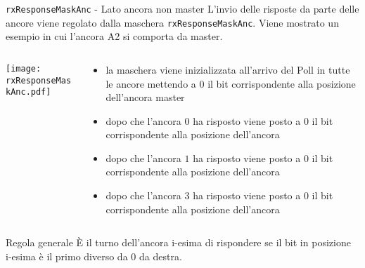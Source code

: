 \begin{frame}[shrink=10]{\lstinline[language=C]!rxResponseMaskAnc! - Lato ancora \alert{non} master}
  L'invio delle risposte da parte delle ancore viene regolato dalla maschera \lstinline[language=C]!rxResponseMaskAnc!.
  Viene mostrato un esempio in cui l'ancora A2 si comporta da master.
  \begin{columns}
    \begin{column}{0.4\textwidth}
      \begin{center}
        \texttt{[image: rxResponseMaskAnc.pdf]}
      \end{center}
    \end{column}
    \begin{column}{0.7\textwidth}
      \begin{itemize}
      \item[1)] la maschera viene inizializzata all'arrivo del Poll in tutte le ancore mettendo a $0$ il bit corrispondente alla posizione dell'ancora master
      \item[2)] dopo che l'ancora $0$ ha risposto viene posto a $0$ il bit corrispondente alla posizione dell'ancora 
      \item[3)] dopo che l'ancora $1$ ha risposto viene posto a $0$ il bit corrispondente alla posizione dell'ancora 
      \item[4)] dopo che l'ancora $3$ ha risposto viene posto a $0$ il bit corrispondente alla posizione dell'ancora 
      \end{itemize}
    \end{column}
  \end{columns}
  \begin{exampleblock}{Regola generale}
    È il turno dell'ancora i-esima di rispondere se il bit in posizione i-esima è il primo diverso da $0$ da destra.
  \end{exampleblock}
\end{frame}

